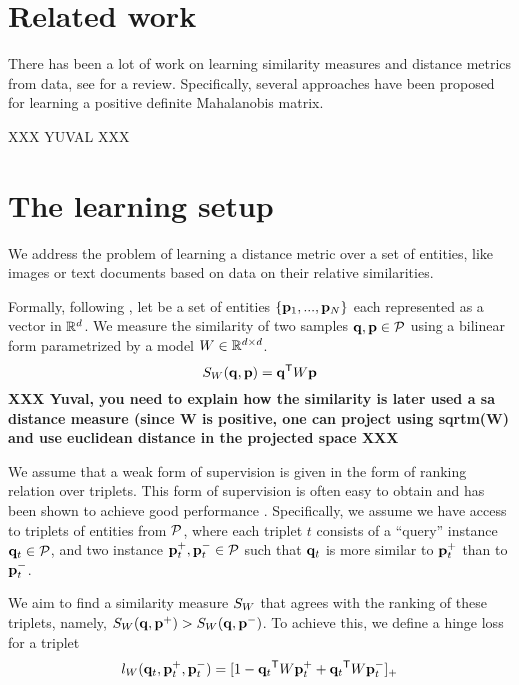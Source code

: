 \documentclass{article}
\begin{document}
\section{Related work}
There has been a lot of work on learning similarity measures and
distance metrics from data, see \cite{} for a review. Specifically,
several approaches have been proposed for learning a positive definite
Mahalanobis matrix.

{XXX YUVAL XXX}


\section{The learning setup}
We address the problem of learning a distance metric over a set of
entities, like images or text documents based on data on their
relative similarities. 

Formally, following \cite{OASIS}, let  be a set of entities
$\{{\mathbf{p}}_1,...,{\mathbf{p}}_N\}$ each represented as a vector in $\mathbb{R}^d$.  We measure
the similarity of two samples ${\mathbf{q}}, {\mathbf{p}} \in \cal{P}$ using a bilinear
form parametrized by a model ${W} \in \mathbb{R}^{d \times d}$.
\begin{equation}
  S_{{W}}({\mathbf{q}}, {\mathbf{p}}) = {\mathbf{q}}{}^\mathsf{T} {W} {\mathbf{p}}
\end{equation}
\newline
{\bf{XXX Yuval, you need to explain how the similarity is later used a sa
distance measure (since W is positive, one can project using sqrtm(W)
and use euclidean distance in the projected space  XXX }}
\newline

We assume that a weak form of supervision is given in the form of
ranking relation over triplets. This form of supervision is often easy
to obtain and has been shown to achieve good performance
\cite{lmnn,oasis,qian}. Specifically, we assume we have access to
triplets of entities from $\cal{P}$, where each triplet $t$ consists of
a ``query'' instance ${\mathbf{q}}_{t} \in \cal{P}$, and two instance ${\mathbf{p}}_{t}^{+},
{\mathbf{p}}_{t}^{-} \in \cal{P}$ such that ${\mathbf{q}}_t$ is more similar to ${\mathbf{p}}_t^+$
than to ${\mathbf{p}}_t^-$.

We aim to find a similarity measure $S_{{W}}$ that agrees with the
ranking of these triplets, namely, $S_{{W}}({\mathbf{q}}, {\mathbf{p}}^+) > S_{{W}}({\mathbf{q}},
{\mathbf{p}}^-)$. To achieve this, we define a hinge loss for a triplet
\begin{equation}
  l_{{W}}({\mathbf{q}}_t, {\mathbf{p}}_t^{+}, {\mathbf{p}}_t^{-})=[1-{\mathbf{q}}_t{}^\mathsf{T} {W} {\mathbf{p}}_t^{+}+{\mathbf{q}}_t{}^\mathsf{T}{W}{\mathbf{p}}_t^{-}]_{+}
  \label{hingelt}
\end{equation}
\end{document}
